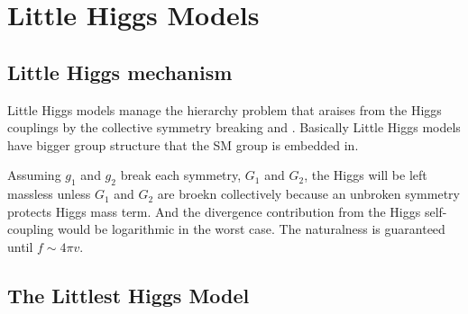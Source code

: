 \chapter{Little Higgs Models}
\label{chap:littlehiggstheory}

\section{Little Higgs mechanism}
Little Higgs models manage the hierarchy problem
that araises from the Higgs couplings 
by the collective symmetry breaking
 and \cite{Callan:1969sn}.
Basically Little Higgs models have bigger group structure that the SM group is embedded in. 


Assuming $g_1$ and $g_2$ break each symmetry, $G_1$ and $G_2$, 
the Higgs will be left massless unless $G_1$ and $G_2$ are broekn collectively
because an unbroken symmetry protects Higgs mass term.
And the divergence contribution from the Higgs self-coupling would be logarithmic in the worst case.
The naturalness is guaranteed until $f \sim 4\pi v$. 


\section{The Littlest Higgs Model}
\cite{Han:2003wu}
